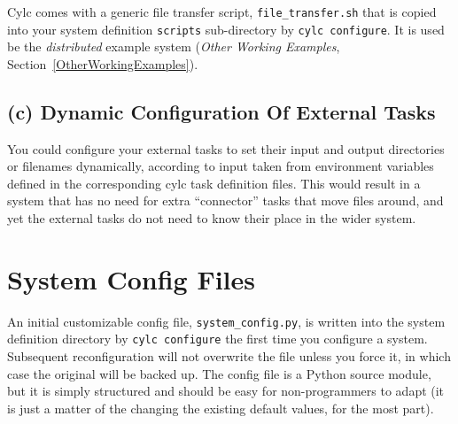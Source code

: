 \documentclass[11pt,a4paper]{article}
\begin{document}
Cylc comes with a generic file transfer script, \lstinline=file_transfer.sh= that
is copied into your system definition \lstinline=scripts= sub-directory 
by \lstinline=cylc configure=. It is used be the {\em distributed}
example system ({\em Other Working Examples}, Section~\ref{OtherWorkingExamples}).

\subsection{(c) Dynamic Configuration Of External Tasks}

You could configure your external tasks to set their input and output
directories or filenames dynamically, according to input taken from
environment variables defined in the corresponding cylc task definition
files. This would result in a system that has no need for extra
``connector'' tasks that move files around, and yet the external tasks
do not need to know their place in the wider system.

%





\pagebreak
\pagebreak
\section{System Config Files}
\label{SystemConfigFiles}

An initial customizable config file, \lstinline=system_config.py=, is
written into the system definition directory by 
\lstinline=cylc configure= the first time you configure a system.
Subsequent reconfiguration will not overwrite the file unless you force
it, in which case the original will be backed up. The config file is a
Python source module, but it is simply structured and should be easy for
non-programmers to adapt (it is just a matter of the changing the
existing default values, for the most part). 
\end{document}
